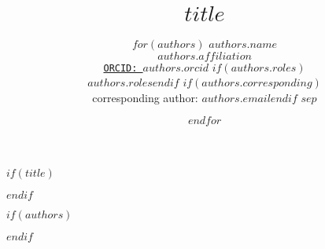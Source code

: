 $if(title)$
\title{$title$}
$endif$

$if(authors)$
\author{%
$for(authors)$%
$authors.name$\\ %
$authors.affiliation$\\ %
\href{https://orcid.org/$authors.orcid$}{\texttt{ORCID: $authors.orcid$}}%
$if(authors.roles)$\\ $authors.roles$$endif$%
$if(authors.corresponding)$\\ {\textasteriskcentered}corresponding author: \href{mailto:$authors.email$}{$authors.email$}$endif$%
$sep$\and %
$endfor$%
}
$endif$

\date{}
\maketitle
